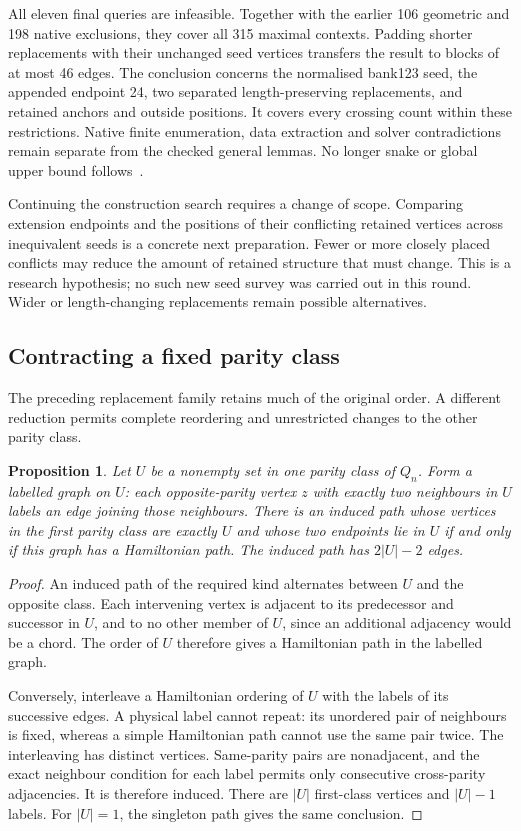 \documentclass[11pt,a4paper]{article}
\newtheorem{proposition}[theorem]{Proposition}
\theoremstyle{definition}
\theoremstyle{remark}
\begin{document}
All eleven final queries are infeasible. Together with the earlier
106 geometric and 198 native exclusions, they cover all 315 maximal
contexts. Padding shorter replacements with their unchanged seed
vertices transfers the result to blocks of at most 46 edges. The
conclusion concerns the normalised bank123 seed, the appended endpoint
24, two separated length-preserving replacements, and retained anchors
and outside positions. It covers every crossing count within these
restrictions. Native finite enumeration, data extraction and solver
contradictions remain separate from the checked general lemmas. No
longer snake or global upper bound follows~\cite{research230}.

Continuing the construction search requires a change of scope. Comparing
extension endpoints and the positions of their conflicting retained
vertices across inequivalent seeds is a concrete next preparation.
Fewer or more closely placed conflicts may reduce the amount of retained
structure that must change. This is a research hypothesis; no such new
seed survey was carried out in this round. Wider or length-changing
replacements remain possible alternatives.

\subsection{Contracting a fixed parity class}\label{sec:colour231}
The preceding replacement family retains much of the original order.
A different reduction permits complete reordering and unrestricted changes
to the other parity class.

\begin{proposition}\label{prop:colour231}
Let $U$ be a nonempty set in one parity class of $Q_n$. Form a labelled
graph on $U$: each opposite-parity vertex $z$ with exactly two neighbours
in $U$ labels an edge joining those neighbours. There is an induced path
whose vertices in the first parity class are exactly $U$ and whose two
endpoints lie in $U$ if and only if this graph has a Hamiltonian path.
The induced path has $2|U|-2$ edges.
\end{proposition}
\begin{proof}
An induced path of the required kind alternates between $U$ and the
opposite class. Each intervening vertex is adjacent to its predecessor
and successor in $U$, and to no other member of $U$, since an additional
adjacency would be a chord. The order of $U$ therefore gives a Hamiltonian
path in the labelled graph.

Conversely, interleave a Hamiltonian ordering of $U$ with the labels of
its successive edges. A physical label cannot repeat: its unordered pair
of neighbours is fixed, whereas a simple Hamiltonian path cannot use
the same pair twice. The interleaving has distinct vertices. Same-parity
pairs are nonadjacent, and the exact neighbour condition for each label
permits only consecutive cross-parity adjacencies. It is therefore induced.
There are $|U|$ first-class vertices and $|U|-1$ labels. For $|U|=1$,
the singleton path gives the same conclusion.
\end{proof}
\end{document}
